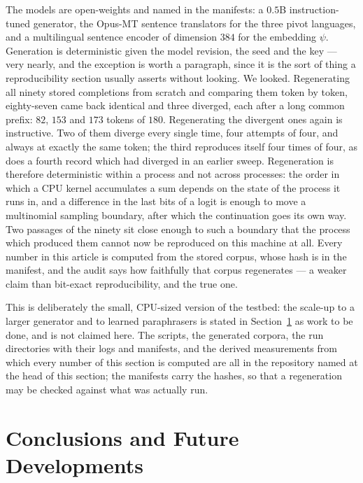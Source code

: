 \documentclass{article}
\theoremstyle{plain}
\theoremstyle{definition}
\numberwithin{equation}{section}
\begin{document}
The models are open-weights and named in the manifests: a $0.5$B
instruction-tuned generator, the Opus-MT sentence translators for the
three pivot languages, and a multilingual sentence encoder of dimension
$384$ for the embedding $\psi$. Generation is deterministic given the
model revision, the seed and the key --- very nearly, and the exception
is worth a paragraph, since it is the sort of thing a reproducibility
section usually asserts without looking. We looked. Regenerating all
ninety stored completions from scratch and comparing them token by
token, eighty-seven came back identical and three diverged, each after a
long common prefix: $82$, $153$ and $173$ tokens of $180$. Regenerating
the divergent ones again is instructive. Two of them diverge every
single time, four attempts of four, and always at exactly the same
token; the third reproduces itself four times of four, as does a fourth
record which had diverged in an earlier sweep. Regeneration is therefore
deterministic within a process and not across processes: the order in
which a CPU kernel accumulates a sum depends on the state of the process
it runs in, and a difference in the last bits of a logit is enough to
move a multinomial sampling boundary, after which the continuation goes
its own way. Two passages of the ninety sit close enough to such a
boundary that the process which produced them cannot now be reproduced
on this machine at all. Every number in this article is computed from
the stored corpus, whose hash is in the manifest, and the audit says how
faithfully that corpus regenerates --- a weaker claim than bit-exact
reproducibility, and the true one.

This is deliberately the small, CPU-sized version of the testbed: the
scale-up to a larger generator and to learned paraphrasers is stated in
Section~\ref{sec:conclusions} as work to be done, and is not claimed
here. The scripts, the generated corpora, the run directories with their
logs and manifests, and the derived measurements from which every number
of this section is computed are all in the repository named at the head
of this section; the manifests carry the hashes, so that a regeneration
may be checked against what was actually run.

\section{Conclusions and Future Developments}\label{sec:conclusions}
\end{document}
